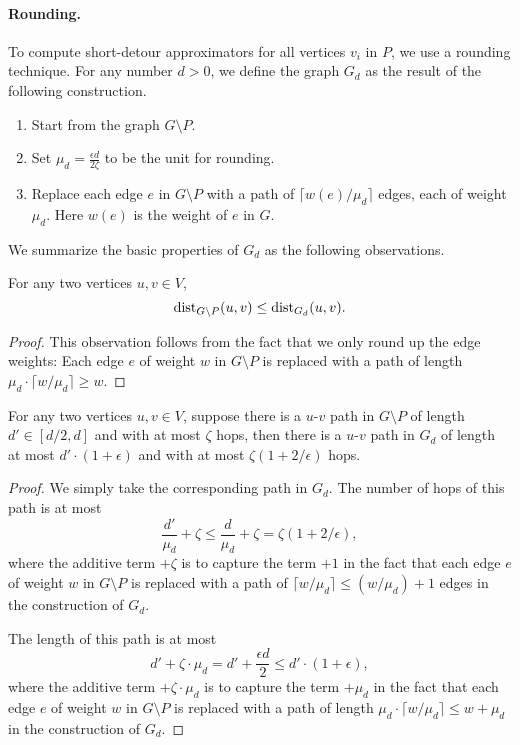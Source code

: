 \paragraph{Rounding.} To compute short-detour approximators for all vertices $v_i$ in $P$, we use a rounding technique. For any number $d  > 0$, we define the graph $G_d$ as the result of the following construction.
\begin{enumerate}
    \item Start from the graph $G \setminus P$.
    \item Set $\mu_d = \frac{\epsilon d}{2\zeta}$ to be the unit for rounding.
    \item Replace each edge $e$ in $G \setminus P$ with a path of $\lceil w(e)/\mu_d\rceil$ edges, each of weight $\mu_d$. Here $w(e)$ is the weight of $e$ in $G$.
\end{enumerate}

We summarize the basic properties of $G_d$ as the following observations.

\begin{observation}\label{obs1}
For any two vertices $u,v \in V$, \[\operatorname{dist}_{G \setminus P}(u,v) \leq \operatorname{dist}_{G_d}(u,v).\]
\end{observation}
\begin{proof}
    This observation follows from the fact that we only round up the edge weights: Each edge $e$ of weight $w$ in  $G \setminus P$ is replaced with a path of length $\mu_d \cdot \lceil w/\mu_d\rceil \geq w$.
\end{proof}

\begin{observation}[Approximation]\label{obs2}
For any two vertices $u,v \in V$, suppose there is a $u$-$v$ path in $G \setminus P$ of length $d' \in [d/2, d]$ and with at most $\zeta$ hops, then there is a $u$-$v$ path in $G_d$ of length at most $d' \cdot (1+\epsilon)$ and with at most $\zeta(1+2/\epsilon)$ hops.
\end{observation}
\begin{proof}
   We simply take the corresponding path in $G_d$. The number of hops of this path is at most \[\frac{d'}{\mu_d} + \zeta \leq \frac{d}{\mu_d} + \zeta = \zeta(1+2/\epsilon),\]
   where the additive term $+\zeta$ is to capture the term $+1$ in the fact that each edge $e$ of weight $w$ in  $G \setminus P$ is replaced with a path of $\lceil w/\mu_d\rceil \leq (w/\mu_d) + 1$ edges in the construction of $G_d$.

   The length of this path is at most 
   \[d' + \zeta\cdot \mu_d  = d' + \frac{\epsilon d}{2} \leq  d'\cdot (1+\epsilon),\]
      where the additive term $+ \zeta\cdot \mu_d $ is to capture the term $+\mu_d$ in the fact that each edge $e$ of weight $w$ in  $G \setminus P$ is replaced with a path of length $\mu_d \cdot \lceil w/\mu_d\rceil \leq w + \mu_d$ in the construction of $G_d$.
\end{proof}

